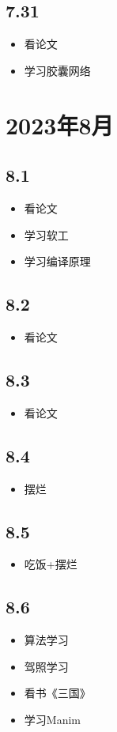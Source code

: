 \documentclass[UTF8]{ctexart}
\begin{document}
\subsection*{7.31}
\begin{itemize}
    \item 看论文
    \item 学习胶囊网络
\end{itemize}

\section*{2023年8月}
\subsection*{8.1}
\begin{itemize}
    \item 看论文
    \item 学习软工
    \item 学习编译原理
\end{itemize}
\subsection*{8.2}
\begin{itemize}
    \item 看论文
\end{itemize}
\subsection*{8.3}
\begin{itemize}
    \item 看论文
\end{itemize}
\subsection*{8.4}
\begin{itemize}
    \item 摆烂
\end{itemize}
\subsection*{8.5}
\begin{itemize}
    \item 吃饭+摆烂
\end{itemize}
\subsection*{8.6}
\begin{itemize}
    \item 算法学习
    \item 驾照学习
    \item 看书《三国》
    \item 学习Manim
\end{itemize}
\end{document}
